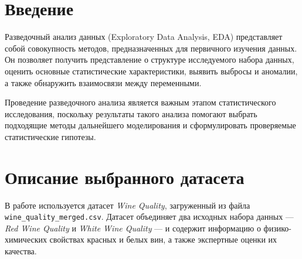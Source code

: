 \section*{Введение}

Разведочный анализ данных (Exploratory Data Analysis, EDA) представляет
собой совокупность методов, предназначенных для первичного изучения
данных. Он позволяет получить представление о структуре исследуемого
набора данных, оценить основные статистические характеристики,
выявить выбросы и аномалии, а также обнаружить взаимосвязи между
переменными.
 
Проведение разведочного анализа является важным этапом
статистического исследования, поскольку результаты такого анализа
помогают выбрать подходящие методы дальнейшего моделирования и
сформулировать проверяемые статистические гипотезы.
 
\section*{\normalfont Описание выбранного датасета}

В работе используется датасет \textit{Wine Quality}, загруженный из файла \texttt{wine\_quality\_merged.csv}. Датасет объединяет два исходных набора данных — \textit{Red Wine Quality} и \textit{White Wine Quality} — и содержит информацию о физико-химических свойствах красных и белых вин, а также экспертные оценки их качества.
 
